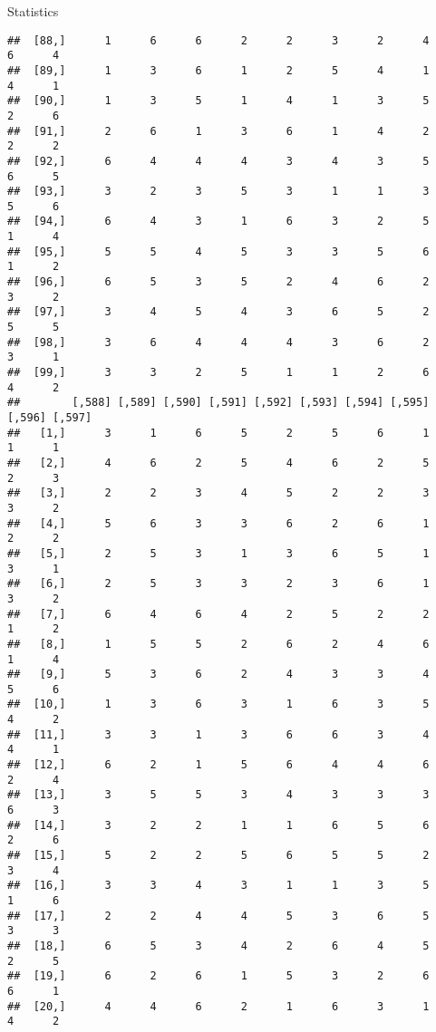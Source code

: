 \documentclass[
  ignorenonframetext,
]{beamer}
\begin{document}
\begin{frame}[fragile]{Statistics}
\begin{verbatim}
##  [88,]      1      6      6      2      2      3      2      4      6      4
##  [89,]      1      3      6      1      2      5      4      1      4      1
##  [90,]      1      3      5      1      4      1      3      5      2      6
##  [91,]      2      6      1      3      6      1      4      2      2      2
##  [92,]      6      4      4      4      3      4      3      5      6      5
##  [93,]      3      2      3      5      3      1      1      3      5      6
##  [94,]      6      4      3      1      6      3      2      5      1      4
##  [95,]      5      5      4      5      3      3      5      6      1      2
##  [96,]      6      5      3      5      2      4      6      2      3      2
##  [97,]      3      4      5      4      3      6      5      2      5      5
##  [98,]      3      6      4      4      4      3      6      2      3      1
##  [99,]      3      3      2      5      1      1      2      6      4      2
##        [,588] [,589] [,590] [,591] [,592] [,593] [,594] [,595] [,596] [,597]
##   [1,]      3      1      6      5      2      5      6      1      1      1
##   [2,]      4      6      2      5      4      6      2      5      2      3
##   [3,]      2      2      3      4      5      2      2      3      3      2
##   [4,]      5      6      3      3      6      2      6      1      2      2
##   [5,]      2      5      3      1      3      6      5      1      3      1
##   [6,]      2      5      3      3      2      3      6      1      3      2
##   [7,]      6      4      6      4      2      5      2      2      1      2
##   [8,]      1      5      5      2      6      2      4      6      1      4
##   [9,]      5      3      6      2      4      3      3      4      5      6
##  [10,]      1      3      6      3      1      6      3      5      4      2
##  [11,]      3      3      1      3      6      6      3      4      4      1
##  [12,]      6      2      1      5      6      4      4      6      2      4
##  [13,]      3      5      5      3      4      3      3      3      6      3
##  [14,]      3      2      2      1      1      6      5      6      2      6
##  [15,]      5      2      2      5      6      5      5      2      3      4
##  [16,]      3      3      4      3      1      1      3      5      1      6
##  [17,]      2      2      4      4      5      3      6      5      3      3
##  [18,]      6      5      3      4      2      6      4      5      2      5
##  [19,]      6      2      6      1      5      3      2      6      6      1
##  [20,]      4      4      6      2      1      6      3      1      4      2

\end{verbatim}
\end{frame}
\end{document}
